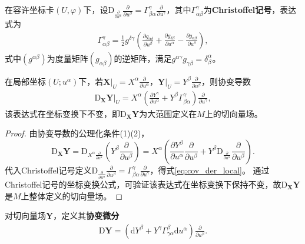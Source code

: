 \documentclass[../../main.tex]{subfiles}%
\begin{document}
\begin{definition}
在容许坐标卡$(U,\varphi)$下，设$\mathrm{D}_{\frac{\partial}{\partial u^\alpha}}\frac{\partial}{\partial u^\beta}=\Gamma_{\beta\alpha}^\gamma\frac{\partial}{\partial u^\gamma}$，其中$\Gamma_{\alpha\beta}^\gamma$为\textbf{Christoffel记号}，表达式为
\begin{align}
\Gamma_{\alpha\beta}^\gamma=\frac{1}{2}g^{\delta\gamma}\left(\frac{\partial g_{\alpha\delta}}{\partial u^\beta}+\frac{\partial g_{\delta\beta}}{\partial u^\alpha}-\frac{\partial g_{\alpha\beta}}{\partial u^\delta}\right),\label{eq:::IO235322JIOWAIJ2.}
\end{align}
式中$(g^{\alpha\beta})$为度量矩阵$(g_{\alpha\beta})$的逆矩阵，满足$g^{\alpha\gamma}g_{\gamma\beta}=\delta_\beta^\alpha$。
\end{definition}

\begin{theorem}
在局部坐标$(U;u^\alpha)$下，若$\boldsymbol{X}|_U=X^\alpha\frac{\partial}{\partial u^\alpha}$，$\boldsymbol{Y}|_U=Y^\beta\frac{\partial}{\partial u^\beta}$，则协变导数
\begin{align}
\mathrm{D}_{\boldsymbol{X}}\boldsymbol{Y}|_U=X^\alpha\left(\frac{\partial Y^\gamma}{\partial u^\alpha}+Y^\beta\Gamma_{\beta\alpha}^\gamma\right)\frac{\partial}{\partial u^\gamma},\label{eq:cov_der_local}
\end{align}
该表达式在坐标变换下不变，即$\mathrm{D}_{\boldsymbol{X}}\boldsymbol{Y}$为大范围定义在$M$上的切向量场。
\end{theorem}

\begin{proof}
由协变导数的公理化条件(1)(2)，
\[
\mathrm{D}_{\boldsymbol{X}}\boldsymbol{Y}=\mathrm{D}_{X^\alpha\frac{\partial}{\partial u^\alpha}}\left(Y^\beta\frac{\partial}{\partial u^\beta}\right)=X^\alpha\left(\frac{\partial Y^\beta}{\partial u^\alpha}\frac{\partial}{\partial u^\beta}+Y^\beta\mathrm{D}_{\frac{\partial}{\partial u^\alpha}}\frac{\partial}{\partial u^\beta}\right).
\]
代入Christoffel记号定义$\mathrm{D}_{\frac{\partial}{\partial u^\alpha}}\frac{\partial}{\partial u^\beta}=\Gamma_{\beta\alpha}^\gamma\frac{\partial}{\partial u^\gamma}$，得式\eqref{eq:cov_der_local}。
通过Christoffel记号的坐标变换公式，可验证该表达式在坐标变换下保持不变，故$\mathrm{D}_{\boldsymbol{X}}\boldsymbol{Y}$是$M$上整体定义的切向量场。
\end{proof}

\begin{definition}
对切向量场$\boldsymbol{Y}$，定义其\textbf{协变微分}
\begin{align}
\mathrm{D}\boldsymbol{Y}=\left(\mathrm{d}Y^\beta+Y^\gamma\Gamma_{\gamma\alpha}^\beta\mathrm{d}u^\alpha\right)\frac{\partial}{\partial u^\beta}.\label{eq:cov_diff_abstract}
\end{align}
\end{definition}
\end{document}
